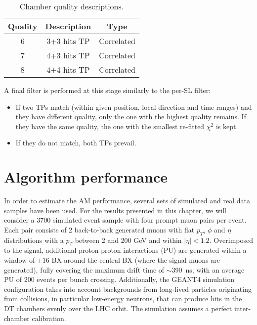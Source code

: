 \documentclass[../main.tex]{subfiles}
\begin{document}
\begin{table}[h!]
	\centering
	\begin{tabular}{c|c|c}
		Quality & Description & Type \\\hline
		6 & 3+3 hits TP & Correlated \\
		7 & 4+3 hits TP & Correlated \\
		8 & 4+4 hits TP & Correlated
	\end{tabular}
	\caption{Chamber quality descriptions.}
	\label{dts:tab:quality_cor}
\end{table}

A final filter is performed at this stage similarly to the per-SL filter:
\begin{itemize}
\item If two TPs match (within given position, local direction and time ranges) and they have different quality, only the one with the highest quality remains. If they have the same quality, the one with the smallest re-fitted $\chi^2$ is kept.
\item If they do not match, both TPs prevail.
\end{itemize}


\section{Algorithm performance}
\label{dts:sec:performance}

In order to estimate the AM performance, several sets of simulated and real data samples have been used. For the results presented in this chapter, we will consider a 3700 simulated event sample with four prompt muon pairs per event. Each pair consists of 2 back-to-back generated muons with flat $p_T$, $\phi$  and $\eta$ distributions with a $p_T$ between 2 and 200 GeV and within $|\eta|<1.2$. Overimposed to the signal, additional proton-proton interactions (PU) are generated within a window of $\pm16$ BX around the central BX (where the signal muons are generated), fully covering the maximum drift time of $\sim$390~ns, with an average PU of 200 events per bunch crossing. Additionally, the GEANT4 simulation configuration takes into account backgrounds from long-lived particles originating from collisions, in particular low-energy neutrons, that can produce hits in the DT chambers evenly over the LHC orbit. The simulation assumes a perfect inter-chamber calibration.
\end{document}
